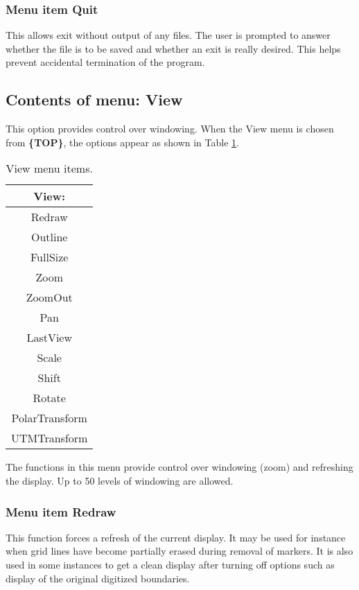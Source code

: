 \documentclass{article}
\begin{document}
\subsubsection[Menu item Quit]{Menu item Quit}
This allows exit without output of any files. The user is prompted to answer whether the file is to be saved and whether an exit is really desired. This helps prevent accidental termination of the program.


\subsection{Contents of menu: View}
This option provides control over windowing. When the View menu is chosen from \textbf{\{TOP\}}, the options appear as shown in Table \ref{tab:VIEW}.

\begin{table}[htb!]
 \caption{View menu items.}
  \begin{center}
   \begin{tabular}{|c|}
    \hline
View:\\     \hline
Redraw \\ Outline \\    \hline
FullSize \\ Zoom \\ ZoomOut \\ Pan \\ LastView \\    \hline
Scale \\ Shift \\ Rotate \\    \hline
PolarTransform \\  UTMTransform \\
    \hline
   \end{tabular}
   \label{tab:VIEW}
  \end{center}
\end{table}


The functions in this menu provide control over windowing (zoom) and refreshing the display. Up to 50 levels of windowing are allowed.

\subsubsection{Menu item Redraw}
This function forces a refresh of the current display. It may be used for instance when grid lines have become partially erased during removal of markers. It is also used in some instances to get a clean display after turning off options such as display of the original digitized boundaries.
\end{document}
